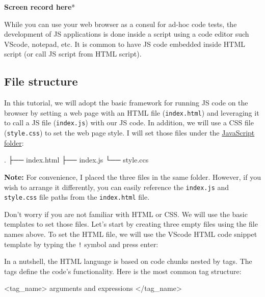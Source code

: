 \documentclass[
  letterpaper,
  DIV=11,
  numbers=noendperiod]{scrreprt}
\newenvironment{Shaded}{\begin{snugshade}}{\end{snugshade}}
\newcommand{\KeywordTok}[1]{\textcolor[rgb]{0.00,0.23,0.31}{#1}}
\newcommand{\NormalTok}[1]{\textcolor[rgb]{0.00,0.23,0.31}{#1}}
\begin{document}
\textbf{Screen record here}*

While you can use your web browser as a consul for ad-hoc code tests,
the development of JS applications is done inside a script using a code
editor such VScode, notepad, etc. It is common to have JS code embedded
inside HTML script (or call JS script from HTML script).

\hypertarget{file-structure}{%
\subsection{File structure}\label{file-structure}}

In this tutorial, we will adopt the basic framework for running JS code
on the browser by setting a web page with an HTML file
(\texttt{index.html}) and leveraging it to call a JS file
(\texttt{index.js}) with our JS code. In addition, we will use a CSS
file (\texttt{style.css}) to set the web page style. I will set those
files under the
\href{https://github.com/RamiKrispin/Tutorials/tree/main/JavaScript}{JavaScript
folder}:

\begin{Shaded}
\begin{Highlighting}[]
\NormalTok{.}
\NormalTok{├── index.html}
\NormalTok{├── index.js}
\NormalTok{└── style.ccs}
\end{Highlighting}
\end{Shaded}

\textbf{Note:} For convenience, I placed the three files in the same
folder. However, if you wish to arrange it differently, you can easily
reference the \texttt{index.js} and \texttt{style.css} file paths from
the \texttt{index.html} file.

Don't worry if you are not familiar with HTML or CSS. We will use the
basic templates to set those files. Let's start by creating three empty
files using the file names above. To set the HTML file, we will use the
VScode HTML code snippet template by typing the \texttt{!} symbol and
press enter:

In a nutshell, the HTML language is based on code chunks nested by tags.
The tags define the code's functionality. Here is the most common tag
structure:

\begin{Shaded}
\begin{Highlighting}[]
\KeywordTok{\textless{}tag\_name\textgreater{}}\NormalTok{ arguments and expressions }\KeywordTok{\textless{}/tag\_name\textgreater{}}
\end{Highlighting}
\end{Shaded}
\end{document}
